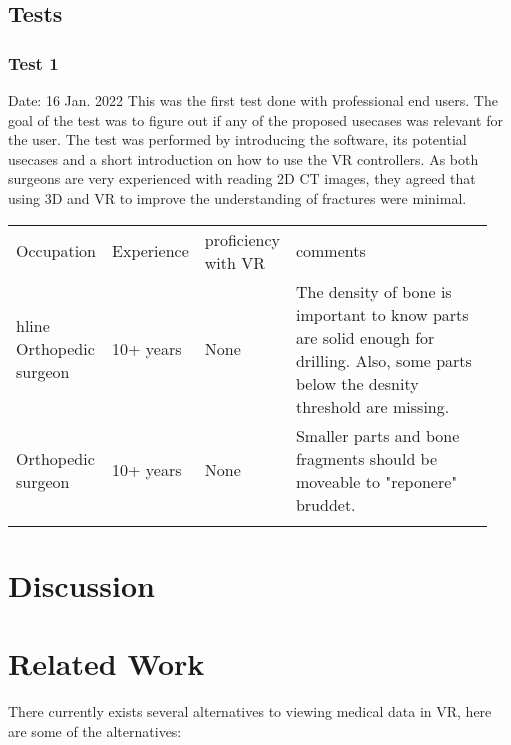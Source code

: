 \documentclass[a4paper]{report}
\begin{document}
\section{Tests}


\subsection{Test 1}
Date: 16 Jan. 2022
This was the first test done with professional end users. The goal of the test was to figure out if any of the proposed usecases was relevant for the user. The test was performed by introducing the software, its potential usecases and a short introduction on how to use the VR controllers.
As both surgeons are very experienced with reading 2D CT images, they agreed that using 3D and VR to improve the understanding of fractures were minimal.

\begin{table}[ht]
\begin{tabular}{p{0.15\linewidth} |p{0.15\linewidth} |p{0.15\linewidth} | p{0.5\linewidth}}
Occupation         & Experience & proficiency with VR & comments                                                                                                                                \\hline
Orthopedic surgeon & 10+ years  & None                & The density of bone is important to know parts are solid enough for drilling. Also, some parts below the desnity threshold are missing. \\
Orthopedic surgeon & 10+ years  & None                & Smaller parts and bone fragments should be moveable to "reponere" bruddet.                                                              \\
                   &            &                     &
\end{tabular}
\end{table}


\chapter{Discussion}\label{Discussion}

\chapter{Related Work}\label{Related Work}

There currently exists several alternatives to viewing medical data in VR, here are some of the alternatives:
\end{document}
